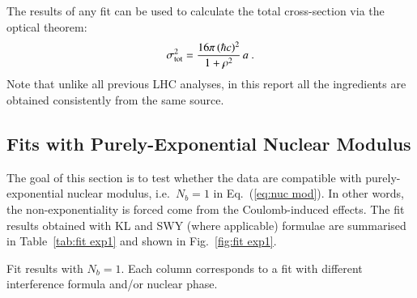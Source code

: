 The results of any fit can be used to calculate the total cross-section via the optical theorem:
\begin{equation}
\label{eq:si tot}
\sigma_{\rm tot}^2 = {16\pi\, (\hbar c)^2\over 1 + \rho^2}\, a\ .
\end{equation}
Note that unlike all previous LHC analyses, in this report all the ingredients are obtained consistently from the same source.


\subsection{Fits with Purely-Exponential Nuclear Modulus}
\label{sec:fit exp1}

The goal of this section is to test whether the data are compatible with purely-exponential nuclear modulus, i.e.~$N_b=1$ in Eq.~(\ref{eq:nuc mod}). In other words, the non-exponentiality is forced come from the Coulomb-induced effects. The fit results obtained with KL and SWY (where applicable) formulae are summarised in Table~\ref{tab:fit exp1} and shown in Fig.~\ref{fig:fit exp1}.

\begin{table}
\caption{Fit results with $N_b=1$. Each column corresponds to a fit with different interference formula and/or nuclear phase. }
\vskip-3mm
\label{tab:fit exp1}
\begin{center}
\setlength\tabcolsep{2.5mm}
\small

\end{center}
\end{table}

